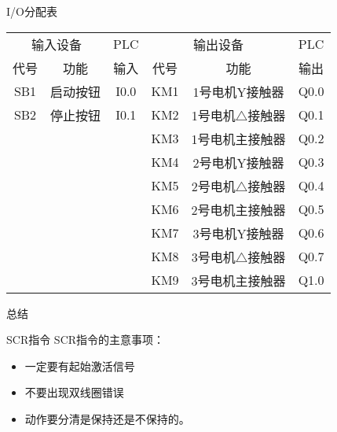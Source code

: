 \begin{frame}
\begin{block}{I/O分配表}
\begin{small}
\begin{tabular}{|c|c|c|c|c|c|}
\hline 
\multicolumn{2}{|c|}{输入设备} & PLC &\multicolumn{2}{|c|}{输出设备} & PLC \\ 
\cline{1-2}\cline{4-5}
代号 & 功能 & 输入 & 代号 & 功能 & 输出 \\ 
\hline 
SB1 & 启动按钮 & I0.0 & KM1 & 1号电机Y接触器 & Q0.0 \\ 
\hline 
SB2 & 停止按钮 & I0.1 & KM2 & 1号电机$\triangle $接触器& Q0.1 \\ 
\hline 
 & &  &KM3  & 1号电机主接触器 &Q0.2  \\ 
\hline
 & &  &KM4  & 2号电机Y接触器 &Q0.3  \\ 
\hline
 & &  &KM5  & 2号电机$\triangle$接触器 &Q0.4  \\ 
\hline
 & &  &KM6  & 2号电机主接触器 &Q0.5  \\ 
\hline
 & &  &KM7  & 3号电机Y接触器 &Q0.6  \\ 
\hline
 & &  &KM8  & 3号电机$\triangle$接触器 &Q0.7  \\ 
\hline
 & &  &KM9  & 3号电机主接触器 &Q1.0 \\ 
\hline
\end{tabular} 
\end{small}
\end{block}
\end{frame}
\begin{frame}{总结}
\begin{block}{SCR指令}
SCR指令的主意事项：
\begin{itemize}
\item 一定要有起始激活信号
\item 不要出现双线圈错误
\item 动作要分清是保持还是不保持的。
\end{itemize}
\end{block}
\end{frame}
\endinput